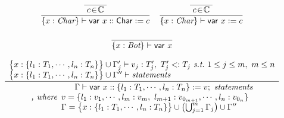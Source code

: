 \documentclass[12pt]{article}
\begin{document}
\begin{displaymath}
\begin{array}{c}
    \begin{array}{rl}
      \dfrac{
        \dfrac{}{
          \raisebox{0.6ex}[2.3ex][0ex]{
            $c \!\in\! \mathbb{C}$
          }
        }
      }{
        \{x : \text{\it Char} \} \vdash \mathsf{var}\ x :: \mathsf{Char} := c
      }
      & \dfrac{
          \dfrac{}{
            \raisebox{0.6ex}[2.3ex][0ex]{
              $c \!\in\! \mathbb{C}$
            }
          }
        }{
          \{x : \text{\it Char} \} \vdash \mathsf{var}\ x := c
        }
    \end{array}  \\
    \\

    \begin{array}{c}
      \dfrac{}{
        \{x : \text{\it Bot} \} \vdash \mathsf{var}\ x
      }
    \end{array}  \\
    \\

    \begin{array}{c}
      \dfrac{
        \begin{array}{l}
          \bigl\{x : \{l_1:T_1, \cdots ,l_n:T_n\} \bigr\} \cup
          \Gamma'_j \vdash v_j : T'_j,\ T'_j <: T_j\ \text{\it s.t.}\
          1 \le j \le m,\ m \le n  \\
          \bigl\{x : \{l_1:T_1, \cdots ,l_n:T_n\} \bigr\} \cup \Gamma''
          \vdash \text{\it statements}
        \end{array}
      }{
        \begin{array}{r}
          \Gamma \vdash \mathsf{var}\ x :: \{l_1:T_1,\cdots ,l_n:T_n\} :=
          v;\ \text{\it statements}  \\
          \text{\it , where} \begin{array}[t]{l}
            v = \{ l_1:v_1,\cdots ,l_m:v_m,\
            l_{m+1}:v_{0_{m+1}},\cdots ,l_n:v_{0_n} \}  \\
            \Gamma = \bigl\{x : \{l_1:T_1, \cdots ,l_n:T_n\} \bigr\} \cup
            \bigl(\bigcup_{j=1}^m \Gamma_j \bigr) \cup \Gamma''
          \end{array}
        \end{array}
      }
    \end{array}
  \end{array}
\end{displaymath}
\end{document}
